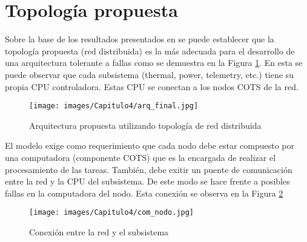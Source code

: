 \section{Topología propuesta}
Sobre la base de los resultados presentados en \citep{Arias17} se puede establecer que la topología propuesta (red distribuida) es la más adecuada para el desarrollo de una arquitectura tolerante a fallas como se demuestra en la Figura \ref{fig:topo_propuesta}. En esta se puede observar que cada subsistema (thermal, power, telemetry, etc.) tiene su propia CPU controladora. Estas CPU se conectan a los nodos COTS de la red.

\begin{figure}[h!]
 \centering
 \texttt{[image: images/Capitulo4/arq\_final.jpg]}
  \caption{Arquitectura propuesta utilizando topología de red distribuida}
\label{fig:topo_propuesta}
\end{figure}

El modelo exige como requerimiento que cada nodo debe estar compuesto por una computadora (componente COTS) que es la encargada de realizar el procesamiento de las tareas. También, debe exitir un puente de comunicación entre la red y la CPU del subsistema. De este modo se hace frente a posibles fallas en la computadora del nodo. Esta conexión se observa en la Figura \ref{fig:conn_prop}

\begin{figure}[h!]
 \centering
 \texttt{[image: images/Capitulo4/com\_nodo.jpg]}
 \caption{Conexión entre la red y el subsistema}
\label{fig:conn_prop}
\end{figure}
